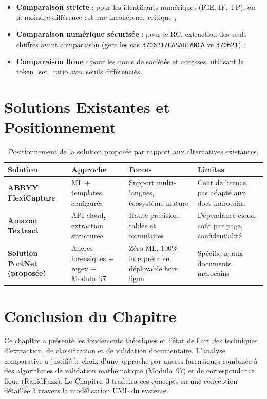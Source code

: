 \begin{itemize}[leftmargin=*, itemsep=4pt]
    \item \textbf{Comparaison stricte} : pour les identifiants num\'{e}riques (ICE, IF, TP), o\`{u} la moindre diff\'{e}rence est une incoh\'{e}rence critique ;
    \item \textbf{Comparaison num\'{e}rique s\'{e}curis\'{e}e} : pour le RC, extraction des seuls chiffres avant comparaison (g\`{e}re les cas \texttt{370621/CASABLANCA} vs \texttt{370621}) ;
    \item \textbf{Comparaison floue} : pour les noms de soci\'{e}t\'{e}s et adresses, utilisant le token\_set\_ratio avec seuils diff\'{e}renci\'{e}s.
\end{itemize}

\section{Solutions Existantes et Positionnement}

\begin{table}[H]
\centering
\small
\begin{tabularx}{\textwidth}{@{}>{\bfseries}p{3cm} Y Y Y@{}}
\toprule
{}
Solution & Approche & Forces & Limites \\
\midrule
ABBYY FlexiCapture & ML + templates configur\'{e}s & Support multi-langues, \'{e}cosyst\`{e}me mature & Co\^{u}t de licence, pas adapt\'{e} aux docs marocains \\
Amazon Textract & API cloud, extraction structur\'{e}e & Haute pr\'{e}cision, tables et formulaires & D\'{e}pendance cloud, co\^{u}t par page, confidentialit\'{e} \\
Solution PortNet (propos\'{e}e) & Ancres forensiques + regex + Modulo~97 & Z\'{e}ro ML, 100\% interpr\'{e}table, d\'{e}ployable hors ligne & Sp\'{e}cifique aux documents marocains \\
\bottomrule
\end{tabularx}
\caption{Positionnement de la solution propos\'{e}e par rapport aux alternatives existantes.}
\label{tab:positionnement}
\end{table}

\section*{Conclusion du Chapitre}

Ce chapitre a pr\'{e}sent\'{e} les fondements th\'{e}oriques et l'\'{e}tat de l'art des techniques d'extraction, de classification et de validation documentaire. L'analyse comparative a justifi\'{e} le choix d'une approche par ancres forensiques combin\'{e}e \`{a} des algorithmes de validation math\'{e}matique (Modulo~97) et de correspondance floue (RapidFuzz). Le Chapitre~3 traduira ces concepts en une conception d\'{e}taill\'{e}e \`{a} travers la mod\'{e}lisation UML du syst\`{e}me.
